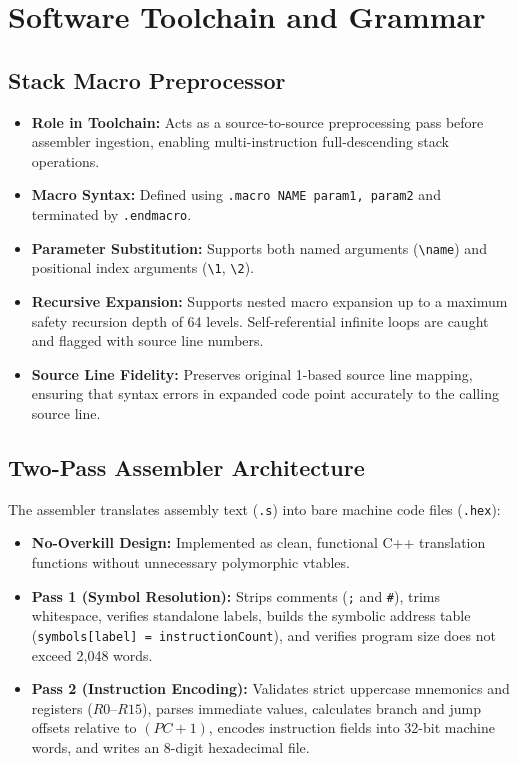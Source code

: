 \documentclass[11pt,a4paper]{article}
\begin{document}
\section{Software Toolchain and Grammar}

\subsection{Stack Macro Preprocessor}
\begin{itemize}
    \item \textbf{Role in Toolchain:} Acts as a source-to-source preprocessing pass before assembler ingestion, enabling multi-instruction full-descending stack operations.
    \item \textbf{Macro Syntax:} Defined using \texttt{.macro NAME param1, param2} and terminated by \texttt{.endmacro}.
    \item \textbf{Parameter Substitution:} Supports both named arguments (\verb|\name|) and positional index arguments (\verb|\1|, \verb|\2|).
    \item \textbf{Recursive Expansion:} Supports nested macro expansion up to a maximum safety recursion depth of 64 levels. Self-referential infinite loops are caught and flagged with source line numbers.
    \item \textbf{Source Line Fidelity:} Preserves original 1-based source line mapping, ensuring that syntax errors in expanded code point accurately to the calling source line.
\end{itemize}

\subsection{Two-Pass Assembler Architecture}
The assembler translates assembly text (\texttt{.s}) into bare machine code files (\texttt{.hex}):
\begin{itemize}
    \item \textbf{No-Overkill Design:} Implemented as clean, functional C++ translation functions without unnecessary polymorphic vtables.
    \item \textbf{Pass 1 (Symbol Resolution):} Strips comments (\texttt{;} and \texttt{\#}), trims whitespace, verifies standalone labels, builds the symbolic address table (\texttt{symbols[label] = instructionCount}), and verifies program size does not exceed 2,048 words.
    \item \textbf{Pass 2 (Instruction Encoding):} Validates strict uppercase mnemonics and registers ($R0$--$R15$), parses immediate values, calculates branch and jump offsets relative to $(PC + 1)$, encodes instruction fields into 32-bit machine words, and writes an 8-digit hexadecimal file.
\end{itemize}
\end{document}
